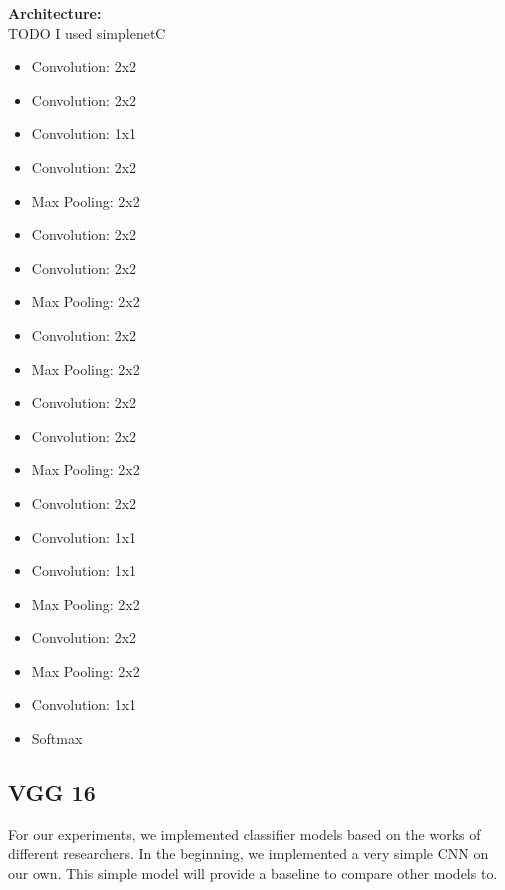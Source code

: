 \documentclass[10pt]{article} %
\begin{document}
\begin{tcolorbox}
	\textbf{Architecture:}
	\\ TODO I used simplenetC
	\begin{itemize}
		\setlength\itemsep{-0.3em}
		\item Convolution: 2x2
		\item Convolution: 2x2
		\item Convolution: 1x1
		\item Convolution: 2x2
		\item Max Pooling: 2x2
		\item Convolution: 2x2
		\item Convolution: 2x2
		\item Max Pooling: 2x2
		\item Convolution: 2x2
		\item Max Pooling: 2x2
		\item Convolution: 2x2
		\item Convolution: 2x2
		\item Max Pooling: 2x2
		\item Convolution: 2x2
		\item Convolution: 1x1
		\item Convolution: 1x1
		\item Max Pooling: 2x2
		\item Convolution: 2x2
		\item Max Pooling: 2x2
		\item Convolution: 1x1
		\item Softmax
	\end{itemize}
\end{tcolorbox}

\subsection{VGG 16}

For our experiments, we implemented classifier models based on the works of different researchers. In the beginning, we implemented a very simple CNN on our own. This simple model will provide a baseline to compare other models to.
\end{document}
